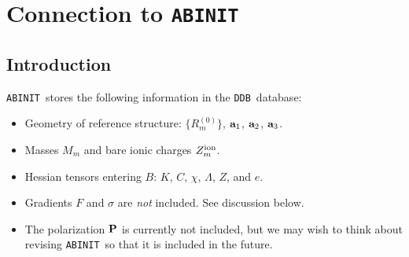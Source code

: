 \documentclass[11pt,fleqn]{article}
\def\P{{\bf P}}
\def\ABINIT{{{\tt ABINIT}}}
\def\DDB{{\tt DDB}}
\begin{document}
%
%

\section{Connection to \ABINIT}
\label{sec:abinit}

\subsection{Introduction}
\label{sec:ab-intro}

\ABINIT\ stores the following information in the
\DDB\ database:
%
\begin{itemize}
\item Geometry of reference structure: $\{R_m^{(0)}\}$,
${\bf a}_1$, ${\bf a}_2$, ${\bf a}_3$.
\item Masses $M_m$ and bare ionic charges $Z_m^{\rm ion}$.
\item Hessian tensors entering $B$: $K$, $C$, $\chi$, $\Lambda$, $Z$, and $e$.
\item Gradients $F$ and $\sigma$ are {\it not} included.  See
  discussion below.
\item The polarization $\P$ is currently not included, but
  we may wish to think about revising \ABINIT\ so that it is
  included in the future.
\end{itemize}
\end{document}
